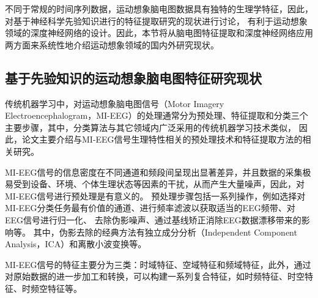 不同于常规的时间序列数据，运动想象脑电图数据具有独特的生理学特征，因此，对基于神经科学先验知识进行的特征提取研究的现状进行讨论，
有利于运动想象领域的深度神经网络的设计。因此，本节将从脑电图特征提取和深度神经网络应用两方面来系统性地介绍运动想象领域的国内外研究现状。

\subsection{基于先验知识的运动想象脑电图特征研究现状}

传统机器学习中，对运动想象脑电图信号（Motor Imagery Electroencephalogram，MI-EEG）的处理通常分为预处理、特征提取和分类三个主要步骤\cite{altaheri2023deep}，其中，分类算法与其它领域内广泛采用的传统机器学习技术类似，
因此，论文主要介绍与MI-EEG信号生理特性相关的预处理技术和特征提取方法的相关研究。

MI-EEG信号的信息密度在不同通道和频段间呈现出显著差异，并且数据的采集极易受到设备、环境、个体生理状态等因素的干扰，从而产生大量噪声，因此，对MI-EEG信号进行预处理是有意义的。
预处理步骤包括一系列操作，例如选择对MI-EEG分类任务最有价值的通道、进行频率滤波以获取适当的EEG频带、对EEG信号进行归一化、
去除伪影噪声\cite{altaheri2023deep}、通过基线矫正消除EEG数据漂移带来的影响等。
其中，伪影去除的经典方法有独立成分分析（Independent Component Analysis，ICA）和离散小波变换\cite{sai2017automated}等。

MI-EEG信号的特征主要分为三类：时域特征、空域特征和频域特征\cite{altaheri2023deep}，此外，通过对原始数据的进一步加工和转换，可以构建一系列复合特征，如时频特征、时空特征、时频空特征等。

